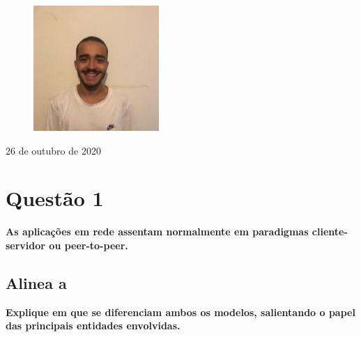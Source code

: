 \documentclass[a4paper, 11pt]{article}
\begin{document}
\begin{titlepage}
\begin{center}
\begin{figure}[!htb]
            \centering
            \captionsetup{pg47488}
        \endminipage
        \hspace{-0.2cm}
            \includegraphics[width=\linewidth]{images/Capa/154.jpg} 
            \centering
            \captionsetup{pg47577}
        \endminipage
    \end{figure}

\blindtext

\vspace{2cm}
        
        26 de outubro de 2020
            
    \end{center}
\end{titlepage}

\newpage
\tableofcontents
\newpage
\section {Questão 1} 
\textbf{As aplicações em rede assentam normalmente em paradigmas cliente-servidor ou peer-to-peer.}
\subsection{Alinea a} 
\textbf{Explique em que se diferenciam ambos os modelos, salientando o papel das principais entidades envolvidas.}
\end{document}
